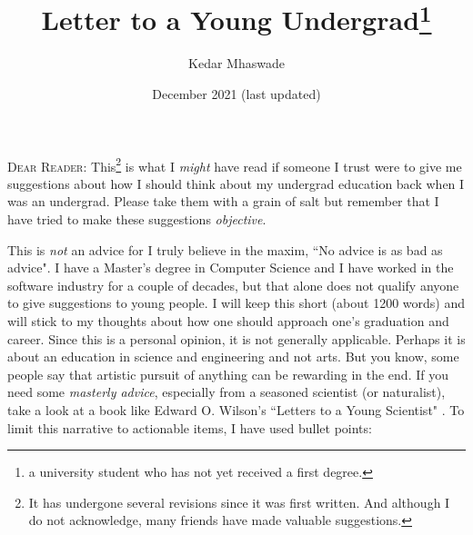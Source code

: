 \documentclass[a6paper]{article}
\begin{document}
\title{Letter to a Young Undergrad\footnote{a university student who has not yet received a first degree.}}
\date{December 2021 {\small (last updated)}}
\author{Kedar Mhaswade}
\maketitle
\lettrine[lines=3]{D}{ear Reader}: This\footnote{It has undergone several revisions since it was first written. And although I do not acknowledge, many friends have made valuable suggestions.} is what I \emph{might} have read if someone I trust were to give me suggestions about how I should think about my undergrad education back when I was an undergrad. Please take them with a grain of salt but remember that I have tried to make these suggestions \emph{objective}. 

This is \emph{not} an advice for I truly believe in the maxim, ``No advice is as bad as advice". I have a Master's degree in Computer Science and I have worked in the software industry for a couple of decades, but that alone does not qualify anyone to give suggestions to young people. I will keep this short (about 1200 words) and will stick to my thoughts about how one should approach one's graduation and career. Since this is a personal opinion, it is not generally applicable. Perhaps it is about an education in science and engineering and not arts. But you know, some people say that artistic pursuit of anything can be rewarding in the end. If you need some \emph{masterly advice}, especially from a seasoned scientist (or naturalist), take a look at a book like Edward O. Wilson's ``Letters to a Young Scientist" \cite{letters}. To limit this narrative to actionable items, I have used bullet points:
\end{document}
